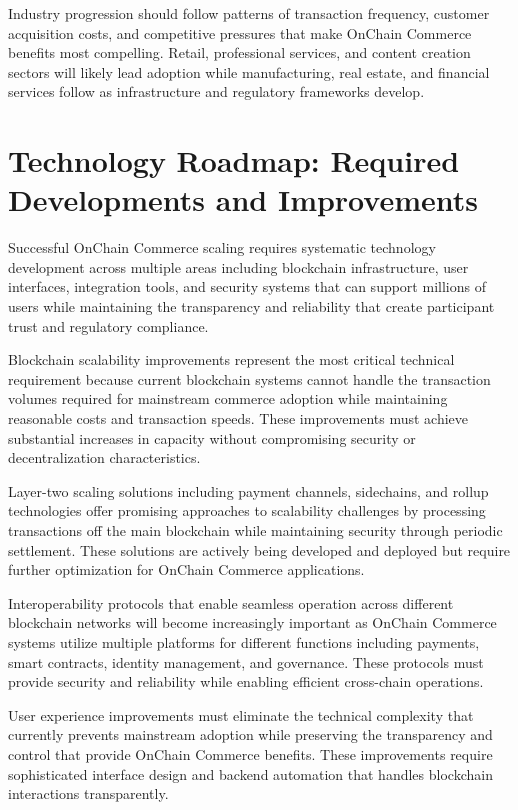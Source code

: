 \documentclass[
  Letterpaper,
]{scrbook}
\begin{document}
Industry progression should follow patterns of transaction frequency,
customer acquisition costs, and competitive pressures that make OnChain
Commerce benefits most compelling. Retail, professional services, and
content creation sectors will likely lead adoption while manufacturing,
real estate, and financial services follow as infrastructure and
regulatory frameworks develop.

\section{Technology Roadmap: Required Developments and
Improvements}\label{technology-roadmap-required-developments-and-improvements}

Successful OnChain Commerce scaling requires systematic technology
development across multiple areas including blockchain infrastructure,
user interfaces, integration tools, and security systems that can
support millions of users while maintaining the transparency and
reliability that create participant trust and regulatory compliance.

Blockchain scalability improvements represent the most critical
technical requirement because current blockchain systems cannot handle
the transaction volumes required for mainstream commerce adoption while
maintaining reasonable costs and transaction speeds. These improvements
must achieve substantial increases in capacity without compromising
security or decentralization characteristics.

Layer-two scaling solutions including payment channels, sidechains, and
rollup technologies offer promising approaches to scalability challenges
by processing transactions off the main blockchain while maintaining
security through periodic settlement. These solutions are actively being
developed and deployed but require further optimization for OnChain
Commerce applications.

Interoperability protocols that enable seamless operation across
different blockchain networks will become increasingly important as
OnChain Commerce systems utilize multiple platforms for different
functions including payments, smart contracts, identity management, and
governance. These protocols must provide security and reliability while
enabling efficient cross-chain operations.

User experience improvements must eliminate the technical complexity
that currently prevents mainstream adoption while preserving the
transparency and control that provide OnChain Commerce benefits. These
improvements require sophisticated interface design and backend
automation that handles blockchain interactions transparently.
\end{document}
